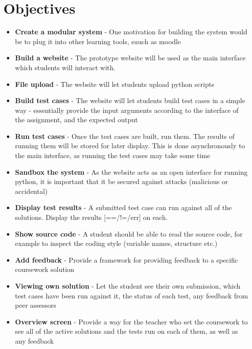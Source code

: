 \documentclass[a4paper,11pt]{report}
\newcommand{\objv}[2]{\item \textbf{#1} - #2}
\begin{document}
\section{Objectives}
\begin{itemize}
 \objv{Create a modular system}{One motivation for building the system would be to plug it into other learning tools, suuch as moodle}
 \objv{Build a website}{The prototype website will be used as the main interface which students will interact with.}
 \objv{File upload}{The website will let students upload python scripts}
 \objv{Build test cases}{The website will let students build test cases in a simple way - essentially provide the input arguments according to the interface of the assignment, and the expected output}
 \objv{Run test cases}{Once the test cases are built, run them. The results of running them will be stored for later display. This is done asynchronously to the main interface, as running the test cases may take some time}
 \objv{Sandbox the system}{As the website acts as an open interface for running python, it is important that it be secured against attacks (malicious or accidental)}
 \objv{Display test results}{A submitted test case can run against all of the solutions. Display the results [==/!=/err] on each.}
 \objv{Show source code}{A student should be able to read the source code, for example to inspect the coding style (variable names, structure etc.)}
 \objv{Add feedback}{Provide a framework for providing feedback to a specific coursework solution}
 \objv{Viewing own solution}{Let the student see their own submission, which test cases have been run against it, the status of each test, any feedback from peer assessors}
 \objv{Overview screen}{Provide a way for the teacher who set the coursework to see all of the active solutions and the tests run on each of them, as well as any feedback}
\end{itemize}
\end{document}
